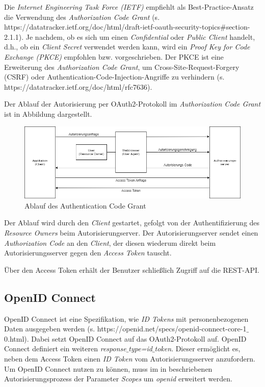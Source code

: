 Die \textit{Internet Engineering Task Force (IETF)} empfiehlt als Best-Practice-Ansatz die Verwendung des \textit{Authorization Code Grant} (s. https://datatracker.ietf.org/doc/html/draft-ietf-oauth-security-topics\#section-2.1.1). 
Je nachdem, ob es sich um einen \textit{Confidential} oder \textit{Public Client} handelt, d.h., ob ein \textit{Client Secret} verwendet werden kann, wird ein \textit{Proof Key for Code Exchange (PKCE)} empfohlen bzw. vorgeschrieben. 
Der PKCE ist eine Erweiterung des \textit{Authorization Code Grant}, um Cross-Site-Request-Forgery (CSRF) oder Authentication-Code-Injection-Angriffe zu verhindern (s. https://datatracker.ietf.org/doc/html/rfc7636).

Der Ablauf der Autorisierung per OAuth2-Protokoll im \textit{Authorization Code Grant} ist in Abbildung  dargestellt. 

\begin{figure}[htbp]
\centering
\includegraphics[width=\textwidth]{Authentication_Code_Grant.png}
\caption{Ablauf des Authentication Code Grant}
\label{fig:auth-code-grant}
\end{figure}

Der Ablauf wird durch den \textit{Client} gestartet, gefolgt von der Authentifizierung des \textit{Resource Owners} beim Autorisierungserver. 
Der Autorisierungserver sendet einen \textit{Authorization Code} an den \textit{Client}, der diesen wiederum direkt beim Autorisierungsserver gegen den \textit{Access Token} tauscht.

Über den Access Token erhält der Benutzer schließlich Zugriff auf die REST-API.

\subsection{OpenID Connect}
\label{auth:openid}

OpenID Connect ist eine Spezifikation, wie \textit{ID Tokens} mit personenbezogenen Daten ausgegeben werden (s. https://openid.net/specs/openid-connect-core-1$\_$0.html). 
Dabei setzt OpenID Connect auf das OAuth2-Protokoll auf. 
OpenID Connect definiert ein weiteren \textit{response$\_$type=id$\_$token}. 
Dieser ermöglicht es, neben dem Access Token einen \textit{ID Token} vom Autorisierungsserver anzufordern. 
Um OpenID Connect nutzen zu können, muss im in  beschriebenen Autorisierungsprozess der Parameter \textit{Scopes} um \textit{openid} erweitert werden.

